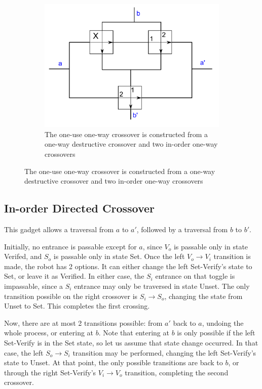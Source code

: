 \documentclass[11pt]{article}
\begin{document}
\begin{figure}[!ht]
  \centering
  \caption{Two types of crossover gadgets}
  \begin{subfigure}[b]{0.9\textwidth}
    \includegraphics[width=\textwidth]{np_crossover}
    \caption{The one-use one-way crossover is constructed from a one-way destructive crossover and two in-order one-way crossovers}
    \label{OneUseCrossover}
  \end{subfigure}

\end{figure}

\subsection{In-order Directed Crossover}
This gadget allows a traversal from $a$ to $a'$, followed by a traversal from $b$ to $b'$.

Initially, no entrance is passable except for $a$, since $V_o$ is passable only in state Verifed, and $S_o$ is
passable only in state Set. Once the left $V_o \rightarrow V_i$ transition is made, the robot has 2 options.
It can either change the left Set-Verify's state to Set, or leave it as Verified. In either case, the $S_i$
entrance on that toggle is impassable, since a $S_i$ entrance may only be traversed in state Unset. The
only transition possible on the right crossover is $S_i \rightarrow S_o$, changing the state from Unset to Set.
This completes the first crossing.

Now, there are at most 2 transitions possible: from $a'$ back to $a$, undoing the whole process, or entering at $b$. Note that entering at $b$ is only possible if the left Set-Verify is in the Set state, so let us assume that state change occurred. In that case, the left $S_o \rightarrow S_i$ transition may be performed, changing the left Set-Verify's state to Unset. At that point, the only possible transitions are back to $b$, or through the right Set-Verify's
$V_i \rightarrow V_o$ transition, completing the second crossover.
\end{document}
